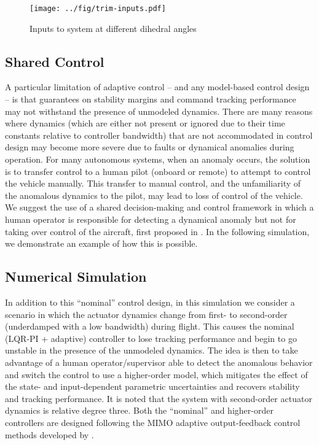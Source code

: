 \documentclass[english]{ifacconf}
\begin{document}
\begin{figure}[htbp]
	\centering
	\texttt{[image: ../fig/trim-inputs.pdf]}
	\caption{Inputs to system at different dihedral angles}
	\label{fig:trim-inputs}
\end{figure}

\subsection{Shared Control}
A particular limitation of adaptive control -- and any model-based control design -- is that guarantees on stability margins and command tracking performance may not withstand the presence of unmodeled dynamics. There are many reasons where dynamics (which are either not present or ignored due to their time constants relative to controller bandwidth) that are not accommodated in control design may become more severe due to faults or dynamical anomalies during operation. For many autonomous systems, when an anomaly occurs, the solution is to transfer control to a human pilot (onboard or remote) to attempt to control the vehicle manually. This transfer to manual control, and the unfamiliarity of the anomalous dynamics to the pilot, may lead to loss of control of the vehicle. We suggest the use of a shared decision-making and control framework in which a human operator is responsible for detecting a dynamical anomaly but not for taking over control of the aircraft, first proposed in \cite{thomsen2018shared}. In the following simulation, we demonstrate an example of how this is possible.

\subsection{Numerical Simulation}
In addition to this ``nominal'' control design, in this simulation we consider a scenario in which the actuator dynamics change from first- to second-order (underdamped with a low bandwidth) during flight. This causes the nominal (LQR-PI + adaptive) controller to lose tracking performance and begin to go unstable in the presence of the unmodeled dynamics. The idea is then to take advantage of a human operator/supervisor able to detect the anomalous behavior and switch the control to use a higher-order model, which mitigates the effect of the state- and input-dependent parametric uncertainties and recovers stability and tracking performance. It is noted that the system with second-order actuator dynamics is relative degree three. Both the ``nominal'' and higher-order controllers are designed following the MIMO adaptive output-feedback control methods developed by \cite{qu2016phd}.
\end{document}
